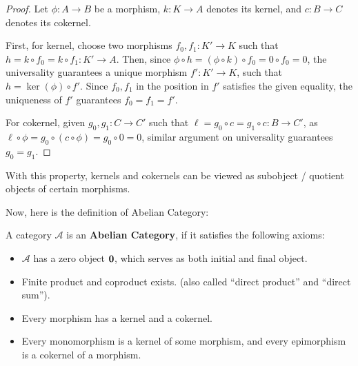 \documentclass{article}
\begin{document}
\begin{proof}
    Let $\phi:A\rightarrow B$ be a morphism, $k:K\rightarrow A$ denotes its kernel, and $c:B\rightarrow C$ denotes its cokernel. 

    \hfil

    First, for kernel, choose two morphisms $f_0,f_1:K'\rightarrow K$ such that $h=k\circ f_0=k\circ f_1:K'\rightarrow A$. Then, since $\phi\circ h = (\phi\circ k)\circ f_0 = 0\circ f_0= 0$, the universality guarantees a unique morphism $f':K'\rightarrow K$, such that $h = \ker(\phi)\circ f'$. Since $f_0,f_1$ in the position in $f'$ satisfies the given equality, the uniqueness of $f'$ guarantees $f_0=f_1=f'$.

    \hfil

    For cokernel, given $g_0,g_1:C\rightarrow C'$ such that $\ell=g_0\circ c=g_1\circ c:B\rightarrow C'$, as $\ell\circ \phi = g_0\circ (c\circ \phi)=g_0\circ 0=0$, similar argument on universality guarantees $g_0=g_1$. 
\end{proof}

\hfil

With this property, kernels and cokernels can be viewed as subobject / quotient objects of certain morphisms.

\hfil

Now, here is the definition of Abelian Category:

\begin{defn}
A category $\mathcal{A}$ is an \textbf{Abelian Category}, if it satisfies the following axioms:

\begin{itemize}
    \item[A0.] $\mathcal{A}$ has a zero object $\mathbf{0}$, which serves as both initial and final object.
    \item[A1.] Finite product and coproduct exists. (also called ``direct product'' and ``direct sum'').
    \item[A2.] Every morphism has a kernel and a cokernel.
    \item[A3.] Every monomorphism is a kernel of some morphism, and every epimorphism is a cokernel of a morphism.  
\end{itemize}
\end{defn}
\end{document}
